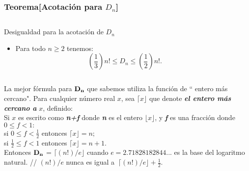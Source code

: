 \documentclass[12pt]{beamer}
\newcommand{\ds}{\displaystyle}
\begin{document}
\begin{frame}
\frametitle{Teorema[Acotación para $D_{n}$]}
\begin{columns}
 \begin{column}{\textwidth}
\begin{block}{Desigualdad para la acotación de $D_{n}$}
\begin{itemize}[<+->]
\item Para todo $n \geq 2$ tenemos:\\
$$\ds(\frac{1}{3})n! \leq D_{n} \leq (\frac{1}{2})n!.$$

\end{itemize}
\end{block}
 \end{column} \ \
\end{columns}
La mejor fórmula para $\bf{D_{n}}$ que sabemos utiliza la función de `` entero más cercano". Para cualquier número real $x$, sea $\lceil x \rfloor$ que denote \textit{\textbf{el entero más cercano a}} $x$, definido:\\
Si $x$ es escrito como \textit{\textbf{n+f}} donde \textit{\textbf{n}} es el entero $\lfloor x \rfloor$, y \textit{\textbf{f}} es una fracción donde $0 \leq f < 1 :$\\

si $0 \leq f < \frac{1}{2}$ \hspace{1cm} entonces $\lceil x \rfloor = n;$\\

si $\frac{1}{2} \leq f < 1$ \hspace{1cm} entonces $\lceil x \rfloor = n+1.$\\
Entonces $\bf{D_{n}}$ = $\lceil(n!)/e\rfloor$ cuando $e = 2.71828182844...$ es la base del logaritmo natural.  // $(n!)/e$  nunca es igual a $~\lceil(n!)/e\rfloor + \frac{1}{2}.$
\end{frame}
\end{document}

